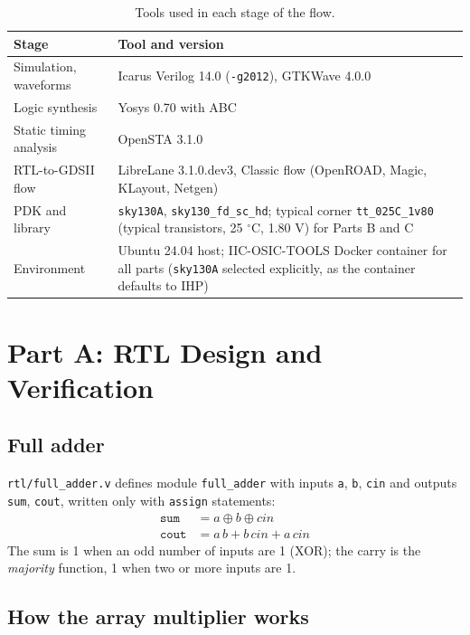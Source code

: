 \documentclass[10pt,a4paper,twocolumn]{article}
\begin{document}
\begin{table}[!htbp]
\centering
\begin{tabularx}{\columnwidth}{lY}
\toprule
\textbf{Stage} & \textbf{Tool and version} \\
\midrule
Simulation, waveforms & Icarus Verilog 14.0 (\texttt{-g2012}), GTKWave 4.0.0 \\
Logic synthesis & Yosys 0.70 with ABC \\
Static timing analysis & OpenSTA 3.1.0 \\
RTL-to-GDSII flow & LibreLane 3.1.0.dev3, Classic flow (OpenROAD, Magic, KLayout, Netgen) \\
PDK and library & \texttt{sky130A}, \texttt{sky130\_fd\_sc\_hd}; typical corner \texttt{tt\_025C\_1v80}
                  (typical transistors, 25 $^\circ$C, 1.80 V) for Parts B and C \\
Environment & Ubuntu 24.04 host; IIC-OSIC-TOOLS Docker container for all parts
              (\texttt{sky130A} selected explicitly, as the container defaults to IHP) \\
\bottomrule
\end{tabularx}
\caption{Tools used in each stage of the flow.}\label{tab:tools}
\end{table}

\section{Part A: RTL Design and Verification}

\subsection{Full adder}

\texttt{rtl/full\_adder.v} defines module \texttt{full\_adder} with inputs \texttt{a}, \texttt{b},
\texttt{cin} and outputs \texttt{sum}, \texttt{cout}, written only with \texttt{assign} statements:
\begin{align*}
\texttt{sum}  &= a \oplus b \oplus cin\\
\texttt{cout} &= a\,b + b\,cin + a\,cin
\end{align*}
The sum is 1 when an odd number of inputs are 1 (XOR); the carry is the \emph{majority} function, 1 when two or
more inputs are 1.

\subsection{How the array multiplier works}
\end{document}
